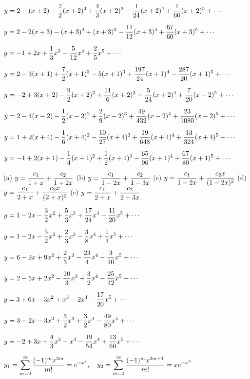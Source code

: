 $y=\displaystyle{2-(x+2)-\frac{7}{2}(x+2)^2+\frac{4}{3}(x+2)^3-\frac{1}{24}(x+2)^4
+\frac{1}{60}(x+2)^5+\cdots}$

$y=\displaystyle{2-2(x+3)-(x+3)^2+(x+3)^3-\frac{11}{12}(x+3)^4+
\frac{67}{60}(x+3)^5+\cdots}$

$y=\displaystyle{-1+2x+\frac{1}{3}x^3-\frac{5}{12}x^4+\frac{2}{5}x^5+\cdots}$

$y=\displaystyle{2-3(x+1)+\frac{7}{2}(x+1)^2-5(x+1)^3+\frac{197}{24}(x+1)^4
-\frac{287}{20}(x+1)^5+\cdots}$

$y=\displaystyle{-2+3(x+2)-\frac{9}{2}(x+2)^2+\frac{11}{6}(x+2)^3+\frac{5}{24}(x+2)^4
+\frac{7}{20}(x+2)^5+\cdots}$

$y=\displaystyle{2-4(x-2)-\frac{1}{2}(x-2)^2+\frac{2}{9}(x-2)^3+\frac{49}{432}(x-2)^4
+\frac{23}{1080}(x-2)^5+\cdots}$

$y=\displaystyle{1+2(x+4)-\frac{1}{6}(x+4)^2-\frac{10}{27}(x+4)^3+\frac{19}{648}(x+4)^4
+\frac{13}{324}(x+4)^5+\cdots}$

$y=\displaystyle{-1+2(x+1)-\frac{1}{4}(x+1)^2+\frac{1}{2}(x+1)^3-\frac{65}{96}(x+1)^4
+\frac{67}{80}(x+1)^5+\cdots}$

(a) $y=\displaystyle{\frac{c_1}{1+x}+\frac{c_2}{1+2x}}$
(b) $y=\displaystyle{\frac{c_1}{1-2x}+\frac{c_2}{1-3x}}$
(c) $y=\displaystyle{\frac{c_1}{1-2x}+\frac{c_2x}{(1-2x)^2}}$
(d) $y=\displaystyle{\frac{c_1}{2+x}+\frac{c_2x}{(2+x)^2}}$
(e) $y=\displaystyle{\frac{c_1}{2+x}+\frac{c_2}{2+3x}}$

$y=\displaystyle{1-2x-\frac{3}{2}x^2+\frac{5}{3}x^3+\frac{17}{24}x^4-\frac{11}{20}x^5+\cdots}$

$y=\displaystyle{1-2x-\frac{5}{2}x^2+\frac{2}{3}x^3-\frac{3}{8}x^4+\frac{1}{3}x^5+\cdots}$

$y=\displaystyle{6-2x+9x^2+\frac{2}{3}x^3-\frac{23}{4}x^4-\frac{3}{10}x^5+\cdots}$

$y=\displaystyle{2-5x+2x^2-\frac{10}{3}x^3+\frac{3}{2}x^4-\frac{25}{12}x^5+\cdots}$

$y=\displaystyle{3+6x-3x^2+x^3-2x^4-\frac{17}{20}x^5+\cdots}$

$y=\displaystyle{3-2x-3x^2+\frac{3}{2}x^3+\frac{3}{2}x^4-\frac{49}{80}x^5+\cdots}$

$y=\displaystyle{-2+3x+\frac{4}{3}x^2-x^3-\frac{19}{54}x^4+\frac{13}{60}x^5+\cdots}$

$\displaystyle{y_1=\sum^\infty_{m=0} \frac{(-1)^mx^{2m}}{m!}=e^{-x^2}, \quad
y_2=\sum^\infty_{m=0} \frac{(-1)^mx^{2m+1}}{m!}=xe^{-x^2}}$

